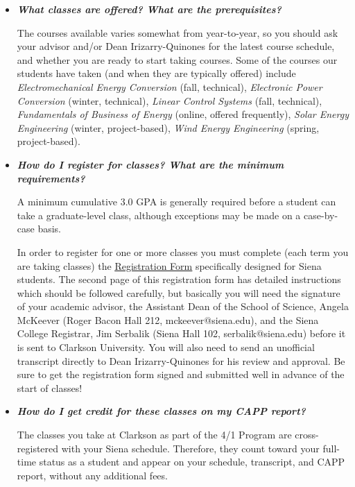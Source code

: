 \documentclass[12pt]{article}
\begin{document}
\begin{itemize}
\item{{\bf {\em What classes are offered?  What are the prerequisites?}}

The courses available varies somewhat from year-to-year, so you should ask your
advisor and/or Dean Irizarry-Quinones for the latest course schedule, and
whether you are ready to start taking courses.  Some of the courses our students
have taken (and when they are typically offered) include {\em Electromechanical
  Energy Conversion} (fall, technical), {\em Electronic Power Conversion}
(winter, technical), {\em Linear Control Systems} (fall, technical), {\em
  Fundamentals of Business of Energy} (online, offered frequently), {\em Solar
  Energy Engineering} (winter, project-based), {\em Wind Energy Engineering}
(spring, project-based).}

\item{{\bf {\em How do I register for classes?  What are the minimum
      requirements?}}

A minimum cumulative 3.0 GPA is generally required before a student can take a
graduate-level class, although exceptions may be made on a case-by-case basis.

In order to register for one or more classes you must complete (each term you
are taking classes) the
\underline{\href{http://www.clarkson.edu/sites/default/files/2017-10/CRC\%20Cross\%20Registration\%20Form.pdf}{Registration
    Form}} specifically designed for Siena students.  The second page of this
registration form has detailed instructions which should be followed carefully,
but basically you will need the signature of your academic advisor, the
Assistant Dean of the School of Science, Angela McKeever (Roger Bacon Hall 212,
mckeever@siena.edu), and the Siena College Registrar, Jim Serbalik (Siena Hall
102, serbalik@siena.edu) before it is sent to Clarkson University.  You will
also need to send an unofficial transcript directly to Dean Irizarry-Quinones
for his review and approval.  Be sure to get the registration form signed and
submitted well in advance of the start of classes!} 

\item{{\bf {\em How do I get credit for these classes on my CAPP report?}}

The classes you take at Clarkson as part of the 4/1 Program are cross-registered
with your Siena schedule.  Therefore, they count toward your full-time status as
a student and appear on your schedule, transcript, and CAPP report, without any
additional fees.}


\end{itemize}
\end{document}

